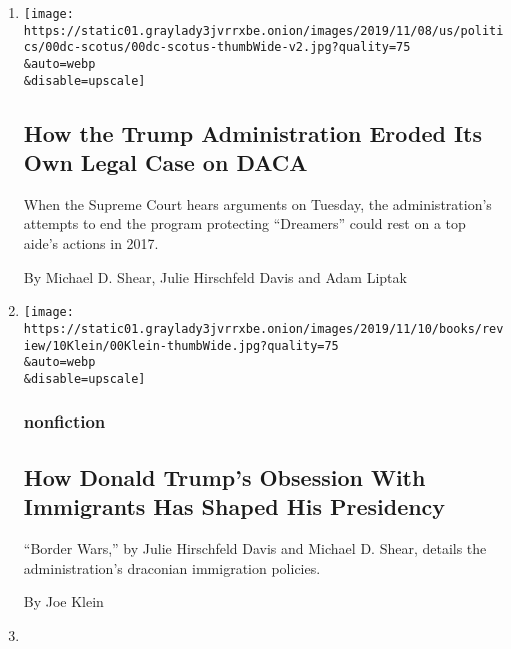 \begin{enumerate}
\def\labelenumi{\arabic{enumi}.}
\item
  \href{/2019/11/11/us/politics/supreme-court-dreamers-case.html}{}

  \texttt{[image: https://static01.graylady3jvrrxbe.onion/images/2019/11/08/us/politics/00dc-scotus/00dc-scotus-thumbWide-v2.jpg?quality=75\\\&auto=webp\\\&disable=upscale]}

  \hypertarget{how-the-trump-administration-eroded-its-own-legal-case-on-daca}{%
  \subsection{How the Trump Administration Eroded Its Own Legal Case on
  DACA}\label{how-the-trump-administration-eroded-its-own-legal-case-on-daca}}

  When the Supreme Court hears arguments on Tuesday, the
  administration's attempts to end the program protecting ``Dreamers''
  could rest on a top aide's actions in 2017.

  By Michael D. Shear, Julie Hirschfeld Davis and Adam Liptak
\item
  \href{/2019/10/08/books/review/border-wars-julie-hirschfeld-davis-michael-d-shear.html}{}

  \texttt{[image: https://static01.graylady3jvrrxbe.onion/images/2019/11/10/books/review/10Klein/00Klein-thumbWide.jpg?quality=75\\\&auto=webp\\\&disable=upscale]}

  \hypertarget{nonfiction}{%
  \subsubsection{nonfiction}\label{nonfiction}}

  \hypertarget{how-donald-trumps-obsession-with-immigrants-has-shaped-his-presidency}{%
  \subsection{How Donald Trump's Obsession With Immigrants Has Shaped
  His
  Presidency}\label{how-donald-trumps-obsession-with-immigrants-has-shaped-his-presidency}}

  ``Border Wars,'' by Julie Hirschfeld Davis and Michael D. Shear,
  details the administration's draconian immigration policies.

  By Joe Klein
\item
  \href{/2019/10/01/us/politics/trump-border-wars.html}{}


\end{enumerate}
